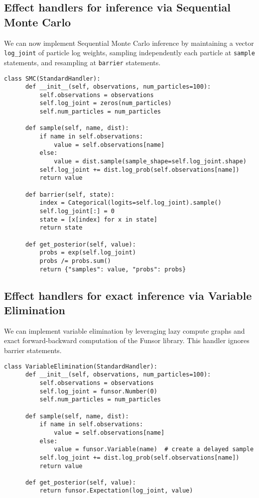\documentclass[anonymous=false, %
               format=acmsmall, %
               review=true, %
               screen=true, %
               nonacm=true]{acmart}
\begin{document}
\subsection{Effect handlers for inference via Sequential Monte Carlo}
\label{sec:appendix:smc}
We can now implement Sequential Monte Carlo inference by maintaining a vector \verb$log_joint$ of particle log weights, sampling independently each particle at \verb$sample$ statements, and resampling at \verb$barrier$ statements.
\begin{Verbatim}[samepage=true]
  class SMC(StandardHandler):
      def __init__(self, observations, num_particles=100):
          self.observations = observations
          self.log_joint = zeros(num_particles)
          self.num_particles = num_particles
  
      def sample(self, name, dist):
          if name in self.observations:
              value = self.observations[name]
          else:
              value = dist.sample(sample_shape=self.log_joint.shape)
          self.log_joint += dist.log_prob(self.observations[name])
          return value
  
      def barrier(self, state):
          index = Categorical(logits=self.log_joint).sample()
          self.log_joint[:] = 0
          state = [x[index] for x in state]
          return state
  
      def get_posterior(self, value):
          probs = exp(self.log_joint)
          probs /= probs.sum()
          return {"samples": value, "probs": probs}
\end{Verbatim}

\subsection{Effect handlers for exact inference via Variable Elimination}
We can implement variable elimination by leveraging lazy compute graphs and exact forward-backward computation of the Funsor library.
This handler ignores barrier statements.
\label{sec:appendix:exact}
\begin{Verbatim}[samepage=true]
  class VariableElimination(StandardHandler):
      def __init__(self, observations, num_particles=100):
          self.observations = observations
          self.log_joint = funsor.Number(0)
          self.num_particles = num_particles

      def sample(self, name, dist):
          if name in self.observations:
              value = self.observations[name]
          else:
              value = funsor.Variable(name)  # create a delayed sample
          self.log_joint += dist.log_prob(self.observations[name])
          return value

      def get_posterior(self, value):
          return funsor.Expectation(log_joint, value)
\end{Verbatim}
\end{document}

